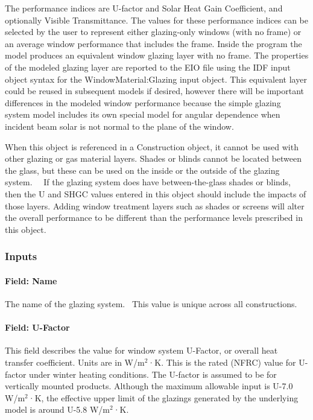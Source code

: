 The performance indices are U-factor and Solar Heat Gain Coefficient, and optionally Visible Transmittance. The values for these performance indices can be selected by the user to represent either glazing-only windows (with no frame) or an average window performance that includes the frame. Inside the program the model produces an equivalent window glazing layer with no frame. The properties of the modeled glazing layer are reported to the EIO file using the IDF input object syntax for the WindowMaterial:Glazing input object. This equivalent layer could be reused in subsequent models if desired, however there will be important differences in the modeled window performance because the simple glazing system model includes its own special model for angular dependence when incident beam solar is not normal to the plane of the window.

When this object is referenced in a Construction object, it cannot be used with other glazing or gas material layers. Shades or blinds cannot be located between the glass, but these can be used on the inside or the outside of the glazing system.~~ If the glazing system does have between-the-glass shades or blinds, then the U and SHGC values entered in this object should include the impacts of those layers. Adding window treatment layers such as shades or screens will alter the overall performance to be different than the performance levels prescribed in this object.

\subsubsection{Inputs}\label{inputs-21-006}

\paragraph{Field: Name}\label{field-name-15-009}

The name of the glazing system.~ This value is unique across all constructions.

\paragraph{Field: U-Factor}\label{field-u-factor}

This field describes the value for window system U-Factor, or overall heat transfer coefficient. Units are in W/m\(^{2}\)·K. This is the rated (NFRC) value for U-factor under winter heating conditions. The U-factor is assumed to be for vertically mounted products. Although the maximum allowable input is U-7.0 W/m\(^{2}\)·K, the effective upper limit of the glazings generated by the underlying model is around U-5.8 W/m\(^{2}\)·K.

